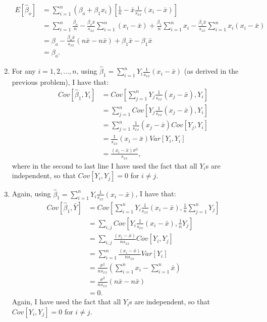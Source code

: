 \begin{problem}{24}
\begin{enumerate}
\begin{align*}
E[\hat \beta_o] & =  \sum_{i=1}^n (\beta_o+\beta_1x_i)\left[\frac{1}{n} -\bar x \frac{1}{s_{xx}} (x_i-\bar x)\right ] \\
& = \sum_{i=1}^n \frac{\beta_o}{n}-\frac{\beta_o \bar x}{s_{xx}}\sum_{i=1}^n (x_i-\bar x)+\frac{\beta_1}{n}\sum_{i=1}^n x_i -\frac{\beta_1 \bar x}{s_{xx}} \sum_{i=1}^n x_i(x_i -\bar x) \\
& = \beta_o-\frac{\beta_o \bar x}{s_{xx}}(n \bar x -n \bar x)+\beta_1 \bar x-\beta_1 \bar x \\
& = \beta_o.
\end{align*}

\item For any $i=1, 2, \ldots, n$, using $\hat \beta_1 = \sum_{i=1}^n Y_i \frac{1}{s_{xx}}(x_i-\bar x)$ (as derived in the previous problem), I have that:
\begin{align*}
Cov\left[\hat \beta_1, Y_i\right]&=Cov\left [\sum_{j=1}^n Y_j \frac{1}{s_{xx}}(x_j-\bar x), Y_i\right]  \\
&=\sum_{j=1}^n Cov\left[Y_j \frac{1}{s_{xx}}(x_j-\bar x), Y_i\right] \\
&=\sum_{j=1}^n \frac{1}{s_{xx}}(x_j-\bar x) Cov\left[Y_j, Y_i\right] \\
&= \frac{1}{s_{xx}}(x_i-\bar x) Var\left[Y_i, Y_i\right] \\
&= \frac{(x_i-\bar x) \sigma^2}{s_{xx}},
\end{align*}
where in the second to last line I have used the fact that all $Y_i$s are independent, so that $Cov[Y_i, Y_j] = 0$ for $i \neq j$.

\item Again, using $\hat \beta_1 = \sum_{i=1}^n Y_i \frac{1}{s_{xx}}(x_i-\bar x)$, I have that:
\begin{align*}
Cov\left[\hat \beta_1, \bar Y \right]&=Cov\left [\sum_{i=1}^n Y_i \frac{1}{s_{xx}}(x_i-\bar x), \frac{1}{n}\sum_{j=1}^nY_j\right]  \\
&=\sum_{i, j} Cov\left [ Y_i \frac{1}{s_{xx}}(x_i-\bar x), \frac{1}{n}Y_j\right]  \\
&=\sum_{i, j}\frac{(x_i-\bar x)}{n s_{xx}} Cov\left [ Y_i , Y_j\right]  \\
&=\sum_{i=1}^n\frac{(x_i-\bar x)}{n s_{xx}} Var[Y_i] \\
&=\frac{\sigma^2}{ns_{xx}} \left(\sum_{i=1}^n x_i-\sum_{i=1}^n \bar x \right)\\
&=\frac{\sigma^2}{ns_{xx}} (n \bar x - n \bar x)\\
&=0.
\end{align*}
Again, I have used the fact that all $Y_i$s are independent, so that $Cov[Y_i, Y_j] = 0$ for $i \neq j$.




\end{enumerate}
\end{problem}
